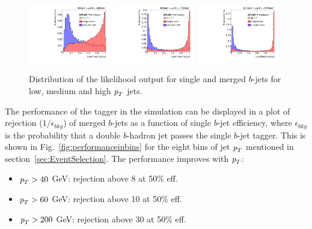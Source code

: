 \begin{figure}[tp]
\centering
\includegraphics[width=0.32\textwidth,viewport=40 0 540 550]{FIGS/Likelihood/NNoutput040_LihoodKDE.pdf}
\includegraphics[width=0.32\textwidth,viewport=40 0 540 550,clip]{FIGS/Likelihood/NNoutput080_LihoodKDE.pdf}
\includegraphics[width=0.32\textwidth,viewport=40 0 540 550,clip]{FIGS/Likelihood/NNoutput200_LihoodKDE.pdf}  
\caption{Distribution of the likelihood output for single and merged $b$-jets for low, medium and high ${\emph{p}_{T}}$ jets.}
\label{fig:outputinbins}
\end{figure}

The performance of the tagger in the simulation can be  %
displayed in a plot of rejection ($1/\epsilon_{bkg}$) of merged $b$-jets as a function of single $b$-jet efficiency, where $\epsilon_{bkg}$ is the probability that a double $b$-hadron jet passes the single $b$-jet tagger. This is shown in Fig.~\ref{fig:performanceinbins} for the eight bins of jet ${\emph{p}_{T}}$ mentioned in section~\ref{sec:EventSelection}. The performance improves with ${\emph{p}_{T}}$:


\begin{itemize}\addtolength{\itemsep}{-0.4\baselineskip}
\item
${\emph{p}_{T}}>40$ GeV: %
rejection above 8 at 50\% eff.
\item
${\emph{p}_{T}}>60$ GeV: %
rejection above 10 at 50\% eff.
\item
${\emph{p}_{T}}>200$ GeV: %
rejection above 30 at 50\% eff.
\end{itemize}


